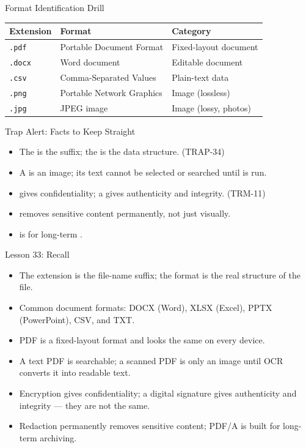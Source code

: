 \documentclass[aspectratio=169]{beamer}
\begin{document}
\begin{frame}{Format Identification Drill}
  \begin{center}
    \begin{tabular}{p{}p{}p{}}
      \toprule
      \textbf{Extension} & \textbf{Format} & \textbf{Category} \\
      \midrule
      \texttt{.pdf} & Portable Document Format & Fixed-layout document \\
      \texttt{.docx} & Word document & Editable document \\
      \texttt{.csv} & Comma-Separated Values & Plain-text data \\
      \texttt{.png} & Portable Network Graphics & Image (lossless) \\
      \texttt{.jpg} & JPEG image & Image (lossy, photos) \\
      \bottomrule
    \end{tabular}
  \end{center}
  \vspace{0.25cm}
\end{frame}

\begin{frame}{Trap Alert: Facts to Keep Straight}
  \begin{itemize}
    \item The  is the suffix; the  is the data
      structure. (TRAP-34)
    \item A  is an image; its text cannot be selected or
      searched until  is run.
    \item {} gives confidentiality; a 
      gives authenticity and integrity. (TRM-11)
    \item {} removes sensitive content permanently, not just
      visually.
    \item {} is for long-term .
  \end{itemize}
\end{frame}

\begin{frame}{Lesson 33: Recall}
  \begin{itemize}
    \item The extension is the file-name suffix; the format is the real
      structure of the file.
    \item Common document formats: DOCX (Word), XLSX (Excel), PPTX
      (PowerPoint), CSV, and TXT.
    \item PDF is a fixed-layout format and looks the same on every device.
    \item A text PDF is searchable; a scanned PDF is only an image until OCR
      converts it into readable text.
    \item Encryption gives confidentiality; a digital signature gives
      authenticity and integrity --- they are not the same.
    \item Redaction permanently removes sensitive content; PDF/A is built for
      long-term archiving.
  \end{itemize}
\end{frame}
\end{document}
